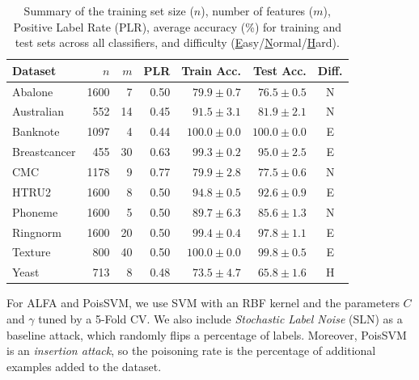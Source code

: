 \documentclass[runningheads]{llncs}
\begin{document}
\begin{table}[ht!]
    \footnotesize
    \centering
    \caption[Summary of Real-World Data]{Summary of the training set size ($n$), number of features ($m$), Positive Label Rate (PLR), average accuracy (\%) for training and test sets across all classifiers, and difficulty (\underline{E}asy/\underline{N}ormal/\underline{H}ard).
    }
    \begin{tabular}{@{\hskip2pt}l@{\hskip2pt}|@{\hskip2pt}r@{\hskip2pt}|@{\hskip2pt}r@{\hskip2pt}|@{\hskip2pt}r@{\hskip2pt}|@{\hskip2pt}r@{\hskip2pt}|@{\hskip2pt}r@{\hskip2pt}|@{\hskip1pt}c@{\hskip1pt}}
        \toprule
        Dataset      & $n$  & $m$ & PLR  & Train Acc.    & Test Acc.     & Diff. \\
        \midrule
        Abalone      & 1600 & 7   & 0.50 & $79.9\pm0.7$  & $76.5\pm0.5$  & N     \\
        Australian   & 552  & 14  & 0.45 & $91.5\pm3.1$  & $81.9\pm2.1$  & N     \\
        Banknote     & 1097 & 4   & 0.44 & $100.0\pm0.0$ & $100.0\pm0.0$ & E     \\
        Breastcancer & 455  & 30  & 0.63 & $99.3\pm0.2$  & $95.0\pm2.5$  & E     \\
        CMC          & 1178 & 9   & 0.77 & $79.9\pm2.8$  & $77.5\pm0.6$  & N     \\
        HTRU2        & 1600 & 8   & 0.50 & $94.8\pm0.5$  & $92.6\pm0.9$  & E     \\
        Phoneme      & 1600 & 5   & 0.50 & $89.7\pm6.3$  & $85.6\pm1.3$  & N     \\
        Ringnorm     & 1600 & 20  & 0.50 & $99.4\pm0.4$  & $97.8\pm1.1$  & E     \\
        Texture      & 800  & 40  & 0.50 & $100.0\pm0.0$ & $99.8\pm0.5$  & E     \\
        Yeast        & 713  & 8   & 0.48 & $73.5\pm4.7$  & $65.8\pm1.6$  & H     \\
        \bottomrule
    \end{tabular}
    \label{tab.datasets}
\end{table}

For ALFA and PoisSVM, we use SVM with an RBF kernel and the parameters $C$ and $\gamma$ tuned by a 5-Fold CV.
We also include {\em Stochastic Label Noise} (SLN) as a baseline attack, which randomly flips a percentage of labels.
Moreover, PoisSVM is an {\em insertion attack}, so the poisoning rate is the percentage of additional examples added to the dataset.
\end{document}
